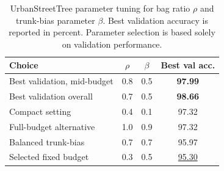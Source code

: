 \documentclass{ieeeaccess}
\begin{document}
\begin{table}[t]
\centering
\caption{Selected preliminary ablations used for configuration choices on UrbanStreetTree
         validation. Values are accuracy in percent.}
\label{tab:prelim_ablation}
\end{table}

\begin{table}[!t]
\centering
\caption{UrbanStreetTree parameter tuning for bag ratio $\rho$ and trunk-bias parameter $\beta$.
         Best validation accuracy is reported in percent. Parameter selection is based solely on
         validation performance.}
\label{tab:param_tuning}
\small
\begin{tabular*}{0.75\textwidth}{@{\extracolsep{\fill}}lccc}
\toprule
Choice & $\rho$ & $\beta$ & Best val acc. \\
\midrule
Best validation, mid-budget & 0.8 & 0.5 & \textbf{97.99} \\
Best validation overall     & 0.7 & 0.5 & \textbf{98.66} \\
Compact setting             & 0.4 & 0.1 & 97.32 \\
Full-budget alternative     & 1.0 & 0.9 & 97.32 \\
Balanced trunk-bias         & 0.7 & 0.7 & 95.97 \\
Selected fixed budget       & 0.3 & 0.5 & \underline{95.30} \\
\bottomrule
\end{tabular*}
\end{table}
\end{document}
